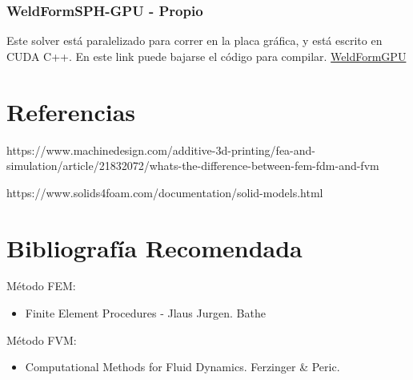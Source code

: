 \documentclass{article}
\begin{document}
\subsubsection{WeldFormSPH-GPU - Propio}
Este solver está paralelizado para correr en la placa gráfica, y está escrito en CUDA C++.
En este link puede bajarse el código para compilar.
\href{https://github.com/luchete80/weldformGPU}{WeldFormGPU}
\section{Referencias}
https://www.machinedesign.com/additive-3d-printing/fea-and-simulation/article/21832072/whats-the-difference-between-fem-fdm-and-fvm 

https://www.solids4foam.com/documentation/solid-models.html

\section{Bibliografía Recomendada}
Método FEM:
\begin{itemize}
\item
Finite Element Procedures - Jlaus Jurgen. Bathe
\end{itemize}
\par

Método FVM:
\begin{itemize}
\item
Computational Methods for Fluid Dynamics. Ferzinger \& Peric.
\end{itemize}
\end{document}
